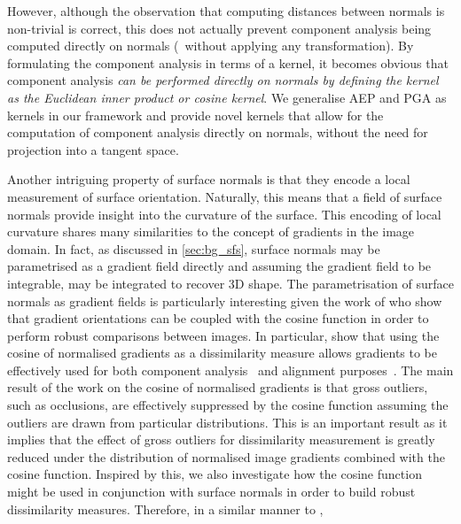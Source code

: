 However,
although the observation that computing distances between normals is non-trivial
is correct, this does not actually prevent component analysis being computed
directly on normals (\ie~without applying any transformation). By formulating
the component analysis in terms of a kernel, it becomes obvious that component
analysis \textit{can be performed directly on normals by defining the kernel as
the Euclidean inner product or cosine kernel}. We generalise AEP and PGA as
kernels in our framework and provide novel kernels that allow for the
computation of component analysis directly on normals, without the need for
projection into a tangent space.

Another intriguing property of surface normals is that they encode a local
measurement of surface orientation. Naturally, this means that a field of
surface normals provide insight into the curvature of the surface. This encoding
of local curvature shares many similarities to the concept of gradients in the
image domain. In fact, as discussed in \cref{sec:bg_sfs}, surface normals may be
parametrised as a gradient field directly and assuming the gradient field to be
integrable, may be integrated to recover 3D shape. The parametrisation of
surface normals as gradient fields is particularly interesting given the work of
\citet{tzimiropoulos2012subspace,tzimiropoulos2011robust,%
tzimiropoulos2014active} who show that gradient orientations can be coupled with
the cosine function in order to perform robust comparisons between images. In
particular, \citet{tzimiropoulos2012subspace} show that using the
cosine of normalised gradients as a dissimilarity measure allows gradients
to be effectively used for both component
analysis~\cite{tzimiropoulos2012subspace,tzimiropoulos2014active} and alignment
purposes~\cite{tzimiropoulos2011robust,tzimiropoulos2014active,%
antonakos2015feature}. The main result of the work on the cosine of normalised
gradients is that gross outliers, such as occlusions, are effectively suppressed
by the cosine function assuming the outliers are drawn from particular
distributions. This is an important result as it implies that the effect
of gross outliers for dissimilarity measurement is greatly reduced
under the distribution of normalised image gradients combined with
the cosine function. Inspired by this, we also investigate how the cosine
function might be used in conjunction with surface normals in order to build
robust dissimilarity measures. Therefore, in a similar manner to
\citet{tzimiropoulos2012subspace,tzimiropoulos2011robust,tzimiropoulos2014active},
